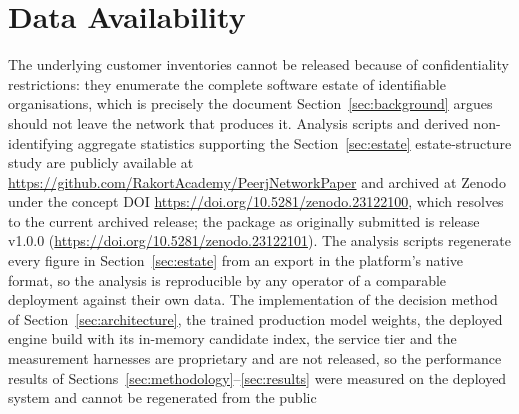 \documentclass[fleqn,10pt,lineno]{wlpeerj}
\newif\ifrefimplreleased
\begin{document}
\section*{Data Availability}
The underlying customer inventories cannot be released because of confidentiality restrictions: they enumerate the complete software estate of identifiable organisations, which is precisely the document Section~\ref{sec:background} argues should not leave the network that produces it. Analysis scripts and derived non-identifying aggregate statistics supporting the Section~\ref{sec:estate} estate-structure study\ifrefimplreleased, together with a research reference implementation of the method of Sections~\ref{sec:architecture}--\ref{sec:transport} that runs end to end on synthetic data and local services,\fi{} are publicly available at \url{https://github.com/RakortAcademy/PeerjNetworkPaper} and archived at Zenodo under the concept DOI \url{https://doi.org/10.5281/zenodo.23122100}, which resolves to the current archived release; the package as originally submitted is release v1.0.0 (\url{https://doi.org/10.5281/zenodo.23122101}). The analysis scripts regenerate every figure in Section~\ref{sec:estate} from an export in the platform's native format, so the analysis is reproducible by any operator of a comparable deployment against their own data. \ifrefimplreleased The research reference implementation comprises the decision procedure with its learned tagger, the source of the compiled engine and the service tier, taken from the authors' research snapshot of 1 August 2026 with production couplings replaced by in-process or local providers, and with the curated rule tables, test fixtures and code comments that had been filled from the deployed system's operation replaced by independently constructed fictional entries, so that its gates demonstrate the mechanism without reproducing the deployed system's product knowledge; its \texttt{MAPPING.md} gives every file's origin, lists the code edits file by file and describes these substitutions by category. It is released for inspection and exercise of the method, is not identical to the deployed system, and reproduces no manuscript measurement: it predates the in-memory candidate index of the measured engine build, the item-metered allowance and the per-feed refresh scheduler, and its two engines are not in full verdict parity with each other (the compiled engine's source lacks the language-binding gate, the one rule difference the repository's \texttt{MAPPING.md} records; the two sources are checked against each other by shared test cases rather than end to end, because the compiled engine requires a populated advisory store that is not released). The trained production model weights,\else The implementation of the decision method of Section~\ref{sec:architecture}, the trained production model weights,\fi{} the deployed engine build with its in-memory candidate index, \ifrefimplreleased the service-tier features that post-date the snapshot\else the service tier\fi{} and the measurement harnesses are proprietary and are not released, so the performance results of Sections~\ref{sec:methodology}--\ref{sec:results} were measured on the deployed system and cannot be regenerated from the public 
\end{document}
